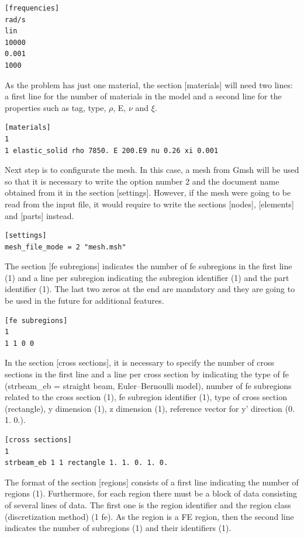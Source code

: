 \documentclass[a4]{article}
\begin{document}
\begin{Verbatim}
[frequencies]
rad/s
lin
10000
0.001
1000
\end{Verbatim}

As the problem has just one material, the section [materials] will need two lines: a first line for the number of materials in the model and a second line for the properties such as tag, type, $\rho$, E, $\nu$ and $\xi$.

\begin{Verbatim}
[materials]
1
1 elastic_solid rho 7850. E 200.E9 nu 0.26 xi 0.001
\end{Verbatim}

Next step is to configurate the mesh. In this case, a mesh from Gmsh will be used so that it is necessary to write the option number 2 and the document name obtained from it in the section [settings]. However, if the mesh were going to be read from the input file, it would require to write the sections [nodes], [elements] and [parts] instead.

\begin{Verbatim}	
[settings]
mesh_file_mode = 2 "mesh.msh"
\end{Verbatim}

The section [fe subregions] indicates the number of fe subregions in the first line (1) and a line per subregion indicating the subregion identifier (1) and the part identifier (1). The last two zeros at the end are mandatory and they are going to be used in the future for additional features.

\begin{Verbatim}
[fe subregions]
1
1 1 0 0
\end{Verbatim}

In the section [cross sections], it is necessary to specify the number of cross sections in the first line and a line per cross section by indicating the type of fe (strbeam\_eb = straight beam, Euler–Bernoulli model), number of fe subregions related to the cross section (1), fe subregion identifier (1), type of cross section (rectangle), y dimension (1), z dimension (1), reference vector for y' direction (0. 1. 0.).

\begin{Verbatim}
[cross sections]
1
strbeam_eb 1 1 rectangle 1. 1. 0. 1. 0.
\end{Verbatim}

The format of the  section [regions] consists of a first line indicating the number of regions (1). Furthermore, for each region there must be a block of data consisting of several lines of data. The first one is the region identifier and the region class (discretization method) (1 fe). As the region is a FE region, then the second line indicates the number of subregions (1) and their identifiers (1).
\end{document}
